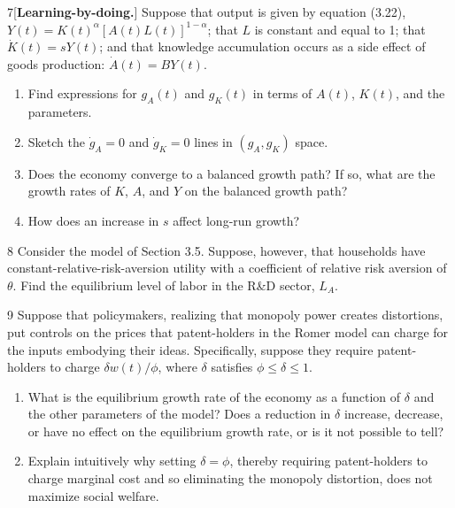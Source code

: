 \begin{problem}{7}[\textbf{Learning-by-doing.}]
Suppose that output is given by equation (3.22), \(Y\left(t\right)=K\left(t\right)^\alpha\left[A\left(t\right)L\left(t\right)\right]^{1-\alpha}\); that \(L\) is constant and equal to 1; that \(\dot{K}\left(t\right)=sY\left(t\right)\); and that knowledge accumulation occurs as a side effect of goods production: \(\dot{A}\left(t\right)=BY\left(t\right)\).
\begin{enumerate}[label=(\alph*)]
    \item Find expressions for \(g_A\left(t\right)\) and \(g_K\left(t\right)\) in terms of \(A\left(t\right)\), \(K\left(t\right)\), and the parameters.
    \item Sketch the \(\dot{g}_A=0\) and \(\dot{g}_K=0\) lines in \(\left(g_A,g_K\right)\) space.
    \item Does the economy converge to a balanced growth path? If so, what are the growth rates of \(K\), \(A\), and \(Y\) on the balanced growth path?
    \item How does an increase in \(s\) affect long-run growth?
\end{enumerate}
\end{problem}

\begin{problem}{8}
Consider the model of Section 3.5. Suppose, however, that households have constant-relative-risk-aversion utility with a coefficient of relative risk aversion of \(\theta\). Find the equilibrium level of labor in the R\&D sector, \(L_A\).
\end{problem}

\begin{problem}{9}
Suppose that policymakers, realizing that monopoly power creates distortions, put controls on the prices that patent-holders in the Romer model can charge for the inputs embodying their ideas. Specifically, suppose they require patent-holders to charge \(\delta w\left(t\right)/\phi\), where \(\delta\) satisfies \(\phi\leq\delta\leq1\).
\begin{enumerate}[label=(\alph*)]
    \item What is the equilibrium growth rate of the economy as a function of \(\delta\) and the other parameters of the model? Does a reduction in \(\delta\) increase, decrease, or have no effect on the equilibrium growth rate, or is it not possible to tell?
    \item Explain intuitively why setting \(\delta=\phi\), thereby requiring patent-holders to charge marginal cost and so eliminating the monopoly distortion, does not maximize social welfare.
\end{enumerate}
\end{problem}

